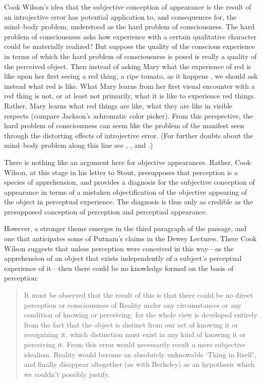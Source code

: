 \documentclass[12pt]{article}
\begin{document}
Cook Wilson's idea that the subjective conception of appearance is the result of an introjective error has potential application to, and consequences for, the mind--body problem, understood as the hard problem of consciousness. The hard problem of consciousness asks how experience with a certain qualitative character could be materially realized? But suppose the quality of the conscious experience in terms of which the hard problem of consciousness is posed is really a quality of the perceived object. Then instead of asking Mary what the experience of red is like upon her first seeing a red thing, a ripe tomato, as it happens \citep{Jackson:1982my}, we should ask instead what red is like. What Mary learns from her first visual encounter with a red thing is not, or at least not primarily, what it is like to experience red things. Rather, Mary learns what red things are like, what they are like in visible respects (compare Jackson's \citeyear{Jackson:1977fk} achromatic color picker). From this perspective, the hard problem of consciousness can seem like the problem of the manifest seen through the distorting effects of introjective error. (For further doubts about the mind--body problem along this line see \citealt{Shoemaker:2003wk}, \citealt{Byrne:2005jw}, and \citealt{Kalderon:2006tg}.)

There is nothing like an argument here for objective appearances. Rather, Cook Wilson, at this stage in his letter to Stout, presupposes that perception is a species of apprehension, and provides a diagnosis for the subjective conception of appearance in terms of a mistaken objectification of the objective appearing of the object in perceptual experience. The diagnosis is thus only as credible as the presupposed conception of perception and perceptual appearance.

However, a stronger theme emerges in the third paragraph of the passage, and one that anticipates some of Putnam's \citeyearpar{Putnam:1994kx} claims in the Dewey Lectures. There Cook Wilson suggests that unless perception were conceived in this way---as the apprehension of an object that exists independently of a subject's perceptual experience of it---then there could be no knowledge formed on the basis of perception:
\begin{quote}
    It must be observed that the result of this is that there could be no direct perception or consciousness of Reality under any circumstances or any condition of knowing or perceiving: for the whole view is developed entirely from the fact that the object is distinct from our act of knowing it or recognizing it, which distinction must exist in any kind of knowing it or perceiving it. From this error would necessarily result a mere subjective idealism. Reality would become an absolutely unknowable `Thing in Itself', and finally disappear altogether (as with Berkeley) as an hypothesis which we couldn't possibly justify. \citep[797]{Cook-Wilson:1926sf}
\end{quote}
\end{document}
